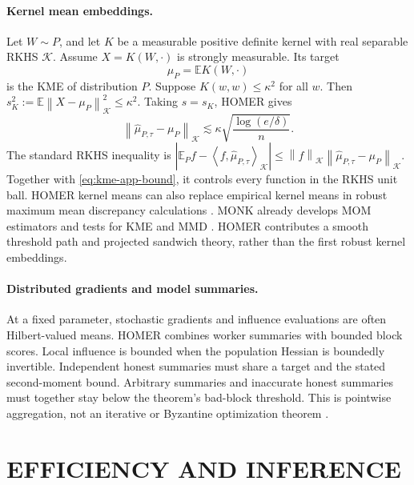 \documentclass[twoside]{article}
\theoremstyle{definition}
\newcommand{\E}{\mathbb E}
\newcommand{\norm}[1]{\left\lVert #1\right\rVert}
\newcommand{\ip}[2]{\left\langle #1,#2\right\rangle}
\begin{document}
\paragraph{Kernel mean embeddings.}
Let $W\sim P$, and let $K$ be a measurable positive definite kernel with real separable RKHS $\mathcal K$. Assume $X=K(W,\cdot)$ is strongly measurable. Its target
\[
    \mu_P=\E K(W,\cdot)
\]
is the KME of distribution $P$. Suppose $K(w,w)\le \kappa^2$ for all $w$. Then $s_K^2:=\E\norm{X-\mu_P}_{\mathcal K}^2\le \kappa^2$. Taking $s=s_K$, HOMER gives
\begin{equation}\label{eq:kme-app-bound}
    \norm{\hat\mu_{P,\tau}-\mu_P}_{\mathcal K}
    \lesssim
    \kappa\sqrt{\frac{\log(e/\delta)}{n}}.
\end{equation}
The standard RKHS inequality is
$|\E_P f-\ip{f}{\hat\mu_{P,\tau}}_{\mathcal K}|\le \norm{f}_{\mathcal K}\norm{\hat\mu_{P,\tau}-\mu_P}_{\mathcal K}$.
Together with \eqref{eq:kme-app-bound}, it controls every function in the RKHS unit ball. HOMER kernel means can also replace empirical kernel means in robust maximum mean discrepancy calculations \citep{gretton_2012_KernelTwoSampleTest,muandet_2017_KernelMeanEmbedding}. MONK already develops MOM estimators and tests for KME and MMD \citep{lerasle_2019_MONKOutlierRobustMean}. HOMER contributes a smooth threshold path and projected sandwich theory, rather than the first robust kernel embeddings.


\paragraph{Distributed gradients and model summaries.}
At a fixed parameter, stochastic gradients and influence evaluations are often Hilbert-valued means. HOMER combines worker summaries with bounded block scores. Local influence is bounded when the population Hessian is boundedly invertible. Independent honest summaries must share a target and the stated second-moment bound. Arbitrary summaries and inaccurate honest summaries must together stay below the theorem's bad-block threshold. This is pointwise aggregation, not an iterative or Byzantine optimization theorem \citep{blanchard_2017_MachineLearningAdversaries,yin_2018_ByzantineRobustDistributedLearning}.


\section{EFFICIENCY AND INFERENCE}
\end{document}
